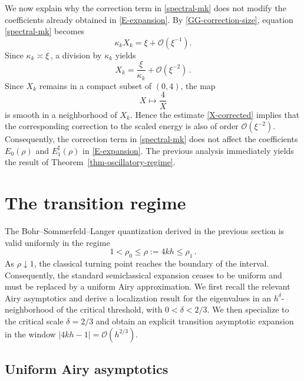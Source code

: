 \documentclass[11pt]{amsart}
\numberwithin{equation}{section}
\theoremstyle{remark}
\newcommand{\mn}{\medskip\noindent}
\begin{document}
We now explain why the correction term in \eqref{spectral-mk} does not
modify the coefficients already obtained in \eqref{E-expansion}. By
\eqref{GG-correction-size}, equation \eqref{spectral-mk} becomes
\begin{equation}\label{kappaX-corrected}
\kappa_kX_k
=
\xi
+
\mathcal O(\xi^{-1}).
\end{equation}
Since \(\kappa_k\asymp\xi\,\), a division by \(\kappa_k\) yields
\begin{equation}\label{X-corrected}
X_k
=
\frac{\xi}{\kappa_k}
+
\mathcal O(\xi^{-2})\,.
\end{equation}
Since \(X_k\) remains in a compact subset of \((0,4)\), the map
\[
X\longmapsto \frac4X
\]
is smooth in a neighborhood of \(X_k\). Hence the estimate
\eqref{X-corrected} implies that the corresponding correction to the
scaled energy is also of order \(\mathcal O(\xi^{-2})\). Consequently, the correction term in
\eqref{spectral-mk} does not affect the coefficients
\(E_0(\rho)\) and \(E_1^\sharp(\rho)\) in
\eqref{E-expansion}.
%
\mn
The previous analysis immediately yields the  result of Theorem~\ref{thm-oscillatory-regime}.





\section{The transition regime}\label{sec:transition}

The Bohr--Sommerfeld--Langer quantization derived in the previous
section is valid uniformly in the regime
\[
1<\rho_0\leq \rho:=4kh\leq\rho_1\,.
\]
As $\rho\downarrow1$, the classical turning point reaches the boundary
of the interval. Consequently, the standard semiclassical expansion
ceases to be uniform and must be replaced by a uniform Airy
approximation. 
	We first recall the relevant Airy asymptotics and derive
	a localization result for the eigenvalues in an $h^\delta$-neighborhood
	of the critical threshold, with $0<\delta<2/3$. We then specialize to
	the critical scale $\delta=2/3$ and obtain an explicit transition asymptotic expansion in the window
	$|4kh-1|=\mathcal O(h^{2/3})$.





%
\subsection{Uniform Airy asymptotics}
\end{document}
